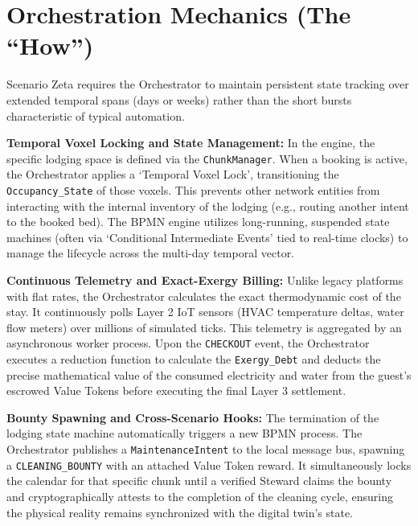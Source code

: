 \section{Orchestration Mechanics (The ``How'')}
Scenario Zeta requires the Orchestrator to maintain persistent state tracking over extended temporal spans (days or weeks) rather than the short bursts characteristic of typical automation.

\textbf{Temporal Voxel Locking and State Management:} In the engine, the specific lodging space is defined via the \texttt{ChunkManager}. When a booking is active, the Orchestrator applies a `Temporal Voxel Lock', transitioning the \texttt{Occupancy\_State} of those voxels. This prevents other network entities from interacting with the internal inventory of the lodging (e.g., routing another intent to the booked bed). The BPMN engine utilizes long-running, suspended state machines (often via `Conditional Intermediate Events' tied to real-time clocks) to manage the lifecycle across the multi-day temporal vector.

\textbf{Continuous Telemetry and Exact-Exergy Billing:} Unlike legacy platforms with flat rates, the Orchestrator calculates the exact thermodynamic cost of the stay. It continuously polls Layer 2 IoT sensors (HVAC temperature deltas, water flow meters) over millions of simulated ticks. This telemetry is aggregated by an asynchronous worker process. Upon the \texttt{CHECKOUT} event, the Orchestrator executes a reduction function to calculate the \texttt{Exergy\_Debt} and deducts the precise mathematical value of the consumed electricity and water from the guest's escrowed Value Tokens before executing the final Layer 3 settlement.

\textbf{Bounty Spawning and Cross-Scenario Hooks:} The termination of the lodging state machine automatically triggers a new BPMN process. The Orchestrator publishes a \texttt{MaintenanceIntent} to the local message bus, spawning a \texttt{CLEANING\_BOUNTY} with an attached Value Token reward. It simultaneously locks the calendar for that specific chunk until a verified Steward claims the bounty and cryptographically attests to the completion of the cleaning cycle, ensuring the physical reality remains synchronized with the digital twin's state.
